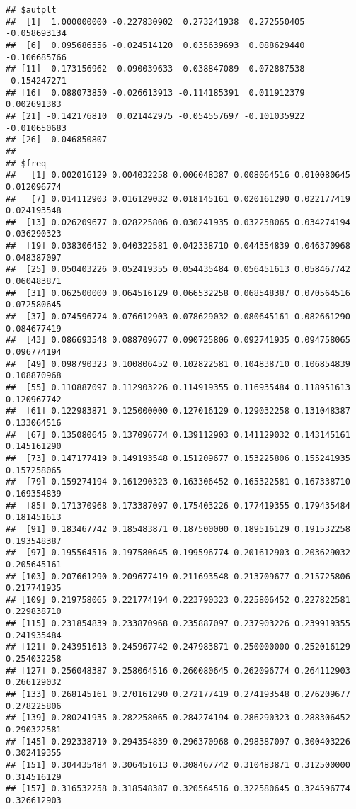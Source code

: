 \documentclass[
]{article}
\begin{document}
\begin{verbatim}
## $autplt
##  [1]  1.000000000 -0.227830902  0.273241938  0.272550405 -0.058693134
##  [6]  0.095686556 -0.024514120  0.035639693  0.088629440 -0.106685766
## [11]  0.173156962 -0.090039633  0.038847089  0.072887538 -0.154247271
## [16]  0.088073850 -0.026613913 -0.114185391  0.011912379  0.002691383
## [21] -0.142176810  0.021442975 -0.054557697 -0.101035922 -0.010650683
## [26] -0.046850807
## 
## $freq
##   [1] 0.002016129 0.004032258 0.006048387 0.008064516 0.010080645 0.012096774
##   [7] 0.014112903 0.016129032 0.018145161 0.020161290 0.022177419 0.024193548
##  [13] 0.026209677 0.028225806 0.030241935 0.032258065 0.034274194 0.036290323
##  [19] 0.038306452 0.040322581 0.042338710 0.044354839 0.046370968 0.048387097
##  [25] 0.050403226 0.052419355 0.054435484 0.056451613 0.058467742 0.060483871
##  [31] 0.062500000 0.064516129 0.066532258 0.068548387 0.070564516 0.072580645
##  [37] 0.074596774 0.076612903 0.078629032 0.080645161 0.082661290 0.084677419
##  [43] 0.086693548 0.088709677 0.090725806 0.092741935 0.094758065 0.096774194
##  [49] 0.098790323 0.100806452 0.102822581 0.104838710 0.106854839 0.108870968
##  [55] 0.110887097 0.112903226 0.114919355 0.116935484 0.118951613 0.120967742
##  [61] 0.122983871 0.125000000 0.127016129 0.129032258 0.131048387 0.133064516
##  [67] 0.135080645 0.137096774 0.139112903 0.141129032 0.143145161 0.145161290
##  [73] 0.147177419 0.149193548 0.151209677 0.153225806 0.155241935 0.157258065
##  [79] 0.159274194 0.161290323 0.163306452 0.165322581 0.167338710 0.169354839
##  [85] 0.171370968 0.173387097 0.175403226 0.177419355 0.179435484 0.181451613
##  [91] 0.183467742 0.185483871 0.187500000 0.189516129 0.191532258 0.193548387
##  [97] 0.195564516 0.197580645 0.199596774 0.201612903 0.203629032 0.205645161
## [103] 0.207661290 0.209677419 0.211693548 0.213709677 0.215725806 0.217741935
## [109] 0.219758065 0.221774194 0.223790323 0.225806452 0.227822581 0.229838710
## [115] 0.231854839 0.233870968 0.235887097 0.237903226 0.239919355 0.241935484
## [121] 0.243951613 0.245967742 0.247983871 0.250000000 0.252016129 0.254032258
## [127] 0.256048387 0.258064516 0.260080645 0.262096774 0.264112903 0.266129032
## [133] 0.268145161 0.270161290 0.272177419 0.274193548 0.276209677 0.278225806
## [139] 0.280241935 0.282258065 0.284274194 0.286290323 0.288306452 0.290322581
## [145] 0.292338710 0.294354839 0.296370968 0.298387097 0.300403226 0.302419355
## [151] 0.304435484 0.306451613 0.308467742 0.310483871 0.312500000 0.314516129
## [157] 0.316532258 0.318548387 0.320564516 0.322580645 0.324596774 0.326612903

\end{verbatim}
\end{document}
